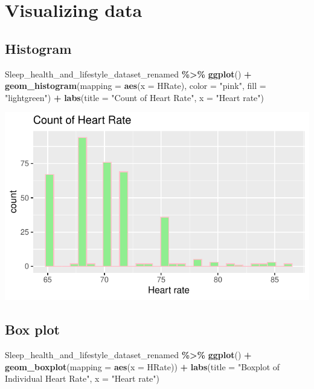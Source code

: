 \documentclass[
  11pt,
]{article}
\newenvironment{Shaded}{\begin{snugshade}}{\end{snugshade}}
\newcommand{\AttributeTok}[1]{\textcolor[rgb]{0.13,0.29,0.53}{#1}}
\newcommand{\FunctionTok}[1]{\textcolor[rgb]{0.13,0.29,0.53}{\textbf{#1}}}
\newcommand{\NormalTok}[1]{#1}
\newcommand{\SpecialCharTok}[1]{\textcolor[rgb]{0.81,0.36,0.00}{\textbf{#1}}}
\newcommand{\StringTok}[1]{\textcolor[rgb]{0.31,0.60,0.02}{#1}}
\begin{document}
\hypertarget{visualizing-data}{%
\section{Visualizing data}\label{visualizing-data}}

\hypertarget{histogram}{%
\subsection{Histogram}\label{histogram}}

\begin{Shaded}
\begin{Highlighting}[]
\NormalTok{Sleep\_health\_and\_lifestyle\_dataset\_renamed }\SpecialCharTok{\%\textgreater{}\%}
  \FunctionTok{ggplot}\NormalTok{() }\SpecialCharTok{+}
    \FunctionTok{geom\_histogram}\NormalTok{(}\AttributeTok{mapping =} \FunctionTok{aes}\NormalTok{(}\AttributeTok{x =}\NormalTok{ HRate), }\AttributeTok{color =} \StringTok{"pink"}\NormalTok{, }\AttributeTok{fill =} \StringTok{"lightgreen"}\NormalTok{) }\SpecialCharTok{+}
    \FunctionTok{labs}\NormalTok{(}\AttributeTok{title =} \StringTok{"Count of Heart Rate"}\NormalTok{, }\AttributeTok{x =} \StringTok{"Heart rate"}\NormalTok{) }
\end{Highlighting}
\end{Shaded}

\begin{center}\includegraphics[width=0.7\linewidth]{SleepHelath_files/figure-latex/unnamed-chunk-17-1} \end{center}

\hypertarget{box-plot}{%
\subsection{Box plot}\label{box-plot}}

\begin{Shaded}
\begin{Highlighting}[]
\NormalTok{Sleep\_health\_and\_lifestyle\_dataset\_renamed }\SpecialCharTok{\%\textgreater{}\%}
  \FunctionTok{ggplot}\NormalTok{() }\SpecialCharTok{+}
    \FunctionTok{geom\_boxplot}\NormalTok{(}\AttributeTok{mapping =} \FunctionTok{aes}\NormalTok{(}\AttributeTok{x =}\NormalTok{ HRate)) }\SpecialCharTok{+}
    \FunctionTok{labs}\NormalTok{(}\AttributeTok{title =} \StringTok{"Boxplot of Individual Heart Rate"}\NormalTok{, }\AttributeTok{x =} \StringTok{"Heart rate"}\NormalTok{)}
\end{Highlighting}
\end{Shaded}
\end{document}
